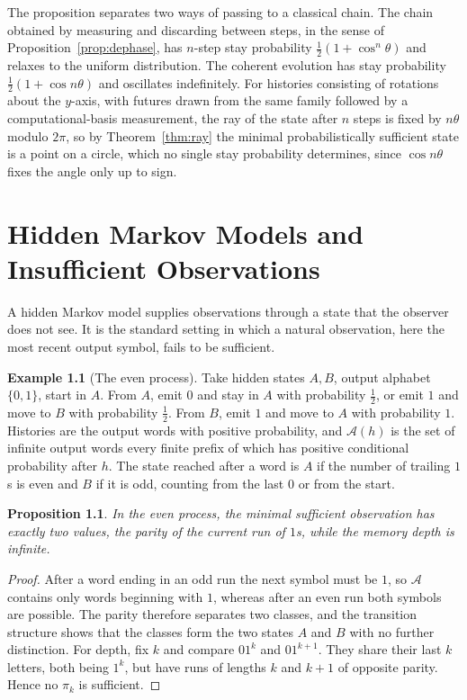 \documentclass[11pt,oneside]{book}
\newtheorem{proposition}[theorem]{Proposition}
\theoremstyle{definition}
\newtheorem{example}[theorem]{Example}
\theoremstyle{remark}
\newcommand{\Adm}{\mathcal{A}}
\begin{document}
The proposition separates two ways of passing to a classical chain. The chain obtained by measuring and discarding between steps, in the sense of Proposition~\ref{prop:dephase}, has $n$-step stay probability $\tfrac12(1+\cos^n\theta)$ and relaxes to the uniform distribution. The coherent evolution has stay probability $\tfrac12(1+\cos n\theta)$ and oscillates indefinitely. For histories consisting of rotations about the $y$-axis, with futures drawn from the same family followed by a computational-basis measurement, the ray of the state after $n$ steps is fixed by $n\theta$ modulo $2\pi$, so by Theorem~\ref{thm:ray} the minimal probabilistically sufficient state is a point on a circle, which no single stay probability determines, since $\cos n\theta$ fixes the angle only up to sign.

\chapter{Hidden Markov Models and Insufficient Observations}\label{ch:hmm}

A hidden Markov model supplies observations through a state that the observer does not see. It is the standard setting in which a natural observation, here the most recent output symbol, fails to be sufficient.

\begin{example}[The even process]\label{ex:even}
Take hidden states $A,B$, output alphabet $\{0,1\}$, start in $A$. From $A$, emit $0$ and stay in $A$ with probability $\tfrac12$, or emit $1$ and move to $B$ with probability $\tfrac12$. From $B$, emit $1$ and move to $A$ with probability $1$. Histories are the output words with positive probability, and $\Adm(h)$ is the set of infinite output words every finite prefix of which has positive conditional probability after $h$. The state reached after a word is $A$ if the number of trailing $1$s is even and $B$ if it is odd, counting from the last $0$ or from the start.
\end{example}

\begin{proposition}\label{prop:even}
In the even process, the minimal sufficient observation has exactly two values, the parity of the current run of $1$s, while the memory depth is infinite.
\end{proposition}

\begin{proof}
After a word ending in an odd run the next symbol must be $1$, so $\Adm$ contains only words beginning with $1$, whereas after an even run both symbols are possible. The parity therefore separates two classes, and the transition structure shows that the classes form the two states $A$ and $B$ with no further distinction. For depth, fix $k$ and compare $01^k$ and $01^{k+1}$. They share their last $k$ letters, both being $1^k$, but have runs of lengths $k$ and $k+1$ of opposite parity. Hence no $\pi_k$ is sufficient.
\end{proof}
\end{document}
